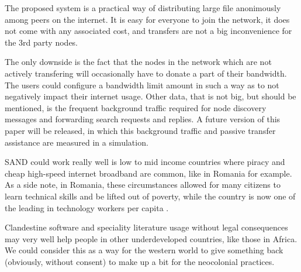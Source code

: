 The proposed system is a practical way of distributing large file anonimously 
among peers on the internet. It is easy for everyone to join the network, it 
does not come with any associated cost, and transfers are not a big 
inconvenience for the 3rd party nodes.

The only downside is the fact that the nodes in the network which are not 
actively transfering will occasionally have to donate a part of their 
bandwidth. The users could configure a bandwidth limit amount in such a way as 
to not negatively impact their internet usage. Other data, that is not big, but 
should be mentioned, is the frequent background traffic required for node 
discovery messages and forwarding search requests and replies. A future version 
of this paper will be released, in which this background traffic and passive 
transfer assistance are measured in a simulation.

SAND could work really well is low to mid income countries where piracy and 
cheap high-speed internet broadband are common, like in Romania for example. As 
a side note, in Romania, these circumstances allowed for many citizens to learn 
technical skills and be lifted out of poverty, while the country is now one of 
the leading in technology workers per capita \cite{romaniasoftwaredev}.

Clandestine software and speciality literature usage without legal consequences 
may very well help people in other underdeveloped countries, like those in 
Africa. We could consider this as a way for the western world to give something 
back (obviously, without consent) to make up a bit for the neocolonial 
practices.
